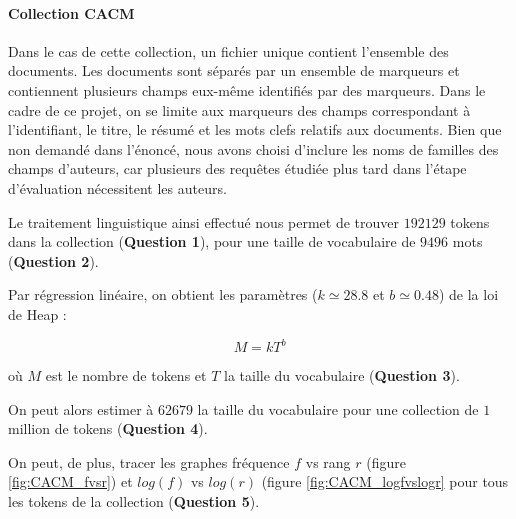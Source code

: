 \documentclass[12pt,a4paper]{article}
\begin{document}
\paragraph{Collection CACM} Dans le cas de cette collection, un fichier unique contient l'ensemble des documents. Les documents sont séparés par un ensemble de marqueurs et contiennent plusieurs champs eux-même identifiés par des marqueurs. Dans le cadre de ce projet, on se limite aux marqueurs des champs correspondant à l'identifiant, le titre, le résumé et les mots clefs relatifs aux documents. Bien que non demandé dans l'énoncé, nous avons choisi d'inclure les noms de familles des champs d'auteurs, car plusieurs des requêtes étudiée plus tard dans l'étape d'évaluation nécessitent les auteurs.

Le traitement linguistique ainsi effectué nous permet de trouver $192129$ tokens dans la collection (\textbf{Question 1}), pour une taille de vocabulaire de $9496$ mots (\textbf{Question 2}).

Par régression linéaire, on obtient les paramètres ($k \simeq 28.8$ et $b \simeq 0.48$) de la loi de Heap :

\[ M =  kT^b \]

où $M$ est le nombre de tokens et $T$ la taille du vocabulaire (\textbf{Question 3}).

On peut alors estimer à $62679$ la taille du vocabulaire pour une collection de $1$ million de tokens (\textbf{Question 4}).

On peut, de plus, tracer les graphes fréquence $f$ vs rang $r$ (figure \ref{fig:CACM_fvsr}) et $log(f)$ vs $log(r)$ (figure \ref{fig:CACM_logfvslogr} pour tous les tokens de la collection (\textbf{Question 5}).
\end{document}
